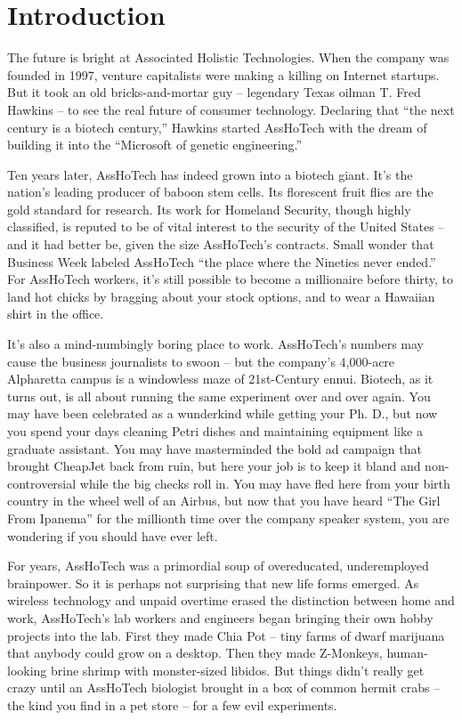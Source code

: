 \documentclass[a4paper,10pt]{article}
\begin{document}
\section*{Introduction}
\label{sec:Introduction}

The future is bright at Associated Holistic Technologies. When the company was founded in 1997, venture capitalists were making a killing on Internet startups. But it took an old bricks-and-mortar guy -- legendary Texas oilman T. Fred Hawkins -- to see the real future of consumer technology. Declaring that ``the next century is a biotech century,'' Hawkins started AssHoTech with the dream of building it into the ``Microsoft of genetic engineering.''

Ten years later, AssHoTech has indeed grown into a biotech giant. It's the nation's leading producer of baboon stem cells. Its florescent fruit flies are the gold standard for research. Its work for Homeland Security, though highly classified, is reputed to be of vital interest to the security of the United States -- and it had better be, given the size AssHoTech's contracts. Small wonder that Business Week labeled AssHoTech ``the place where the Nineties never ended.'' For AssHoTech workers, it's still possible to become a millionaire before thirty, to land hot chicks by bragging about your stock options, and to wear a Hawaiian shirt in the office. 

It's also a mind-numbingly boring place to work. AssHoTech's numbers may cause the business journalists to swoon -- but the company's 4,000-acre Alpharetta campus is a windowless maze of 21st-Century ennui. Biotech, as it turns out, is all about running the same experiment over and over again. You may have been celebrated as a wunderkind while getting your Ph. D., but now you spend your days cleaning Petri dishes and maintaining equipment like a graduate assistant. You may have masterminded the bold ad campaign that brought CheapJet back from ruin, but here your job is to keep it bland and non-controversial while the big checks roll in. You may have fled here from your birth country in the wheel well of an Airbus, but now that you have heard ``The Girl From Ipanema'' for the millionth time over the company speaker system, you are wondering if you should have ever left.

For years, AssHoTech was a primordial soup of overeducated, underemployed brainpower. So it is perhaps not surprising that new life forms emerged. As wireless technology and unpaid overtime erased the distinction between home and work, AssHoTech's lab workers and engineers began bringing their own hobby projects into the lab. First they made Chia Pot -- tiny farms of dwarf marijuana that anybody could grow on a desktop. Then they made Z-Monkeys, human-looking brine shrimp with monster-sized libidos. But things didn't really get crazy until an AssHoTech biologist brought in a box of common hermit crabs -- the kind you find in a pet store -- for a few evil experiments.
\end{document}
